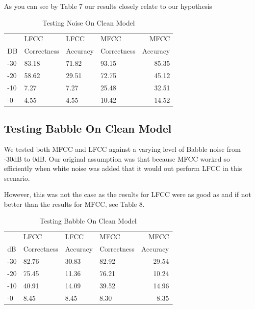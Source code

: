 \documentclass[	DIV=calc,%
							paper=a4,%
							fontsize=9.8pt,%
							twocolumn]{scrartcl}	 					%
\begin{document}
As you can see by Table 7 our results closely relate to our hypothesis 
\begin{table}[h]
	\caption{Testing Noise On Clean Model}
	\centering
	\begin{tabular}{llllr}
		
		\cmidrule(r){1-5}
		\centering  & LFCC & LFCC & MFCC & MFCC\\
		DB &  Correctness &  Accuracy &  Correctness  & Accuracy  \\
		\midrule
		-30 & 83.18 & 71.82 & 93.15 & 85.35 \\
		-20 & 58.62 & 29.51 & 72.75 & 45.12 \\
		-10 & 7.27 & 7.27 & 25.48 & 32.51 \\
		-0 & 4.55 & 4.55 & 10.42 & 14.52 \\
		
		
	\end{tabular}
\end{table}


\subsection{Testing Babble On Clean Model}
We tested both MFCC and LFCC against a varying level of Babble noise from -30dB to 0dB. Our original assumption was that because MFCC worked so efficiently when white noise was added that it would out perform LFCC in this scenario.

However, this was not the case as the results for LFCC were as good as and if not better than the results for MFCC, see Table 8.



\begin{table}[h]
	\caption{Testing Babble On Clean Model}
	\centering
	\begin{tabular}{llllr}
		
		\cmidrule(r){1-5}
		\centering  & LFCC & LFCC & MFCC & MFCC\\
		dB &  Correctness &  Accuracy &  Correctness  & Accuracy  \\
		\midrule
		-30 & 82.76 & 30.83 & 82.92 & 29.54 \\
		-20 & 75.45 & 11.36 & 76.21 & 10.24 \\
		-10 & 40.91 & 14.09 & 39.52 & 14.96 \\
		-0 & 8.45 & 8.45 & 8.30 & 8.35 \\
		
		
	\end{tabular}
\end{table}
\end{document}
